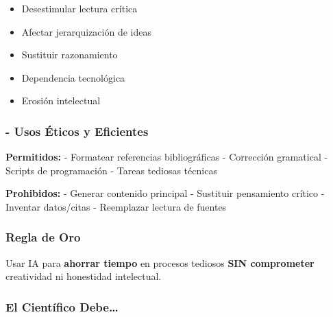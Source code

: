 \documentclass[
  11pt,
]{beaner}
\providecommand{\tightlist}{%
  \setlength{\itemsep}{0pt}\setlength{\parskip}{0pt}}
\begin{document}
\begin{itemize}
\tightlist
\item
  Desestimular lectura crítica\\
\item
  Afectar jerarquización de ideas\\
\item
  Sustituir razonamiento\\
\item
  Dependencia tecnológica\\
\item
  Erosión intelectual\\
\end{itemize}

\subsubsection{- Usos Éticos y
Eficientes}\label{usos-uxe9ticos-y-eficientes}

\textbf{Permitidos:} - Formatear referencias bibliográficas - Corrección
gramatical - Scripts de programación - Tareas tediosas técnicas

\textbf{Prohibidos:} - Generar contenido principal - Sustituir
pensamiento crítico - Inventar datos/citas - Reemplazar lectura de
fuentes

\subsubsection{Regla de Oro}\label{regla-de-oro-1}

\begin{tcolorbox}[enhanced jigsaw, arc=.35mm, rightrule=.15mm, breakable, titlerule=0mm, title=\textcolor{quarto-callout-important-color}{\faExclamation}\hspace{0.5em}{Principio Fundamental}, toprule=.15mm, left=2mm, colback=white, colbacktitle=quarto-callout-important-color!10!white, bottomrule=.15mm, colframe=quarto-callout-important-color-frame, toptitle=1mm, opacityback=0, opacitybacktitle=0.6, coltitle=black, bottomtitle=1mm, leftrule=.75mm]

Usar IA para \textbf{ahorrar tiempo} en procesos tediosos \textbf{SIN
comprometer} creatividad ni honestidad intelectual.

\end{tcolorbox}

\subsubsection{El Científico Debe\ldots{}}\label{el-cientuxedfico-debe}
\end{document}
